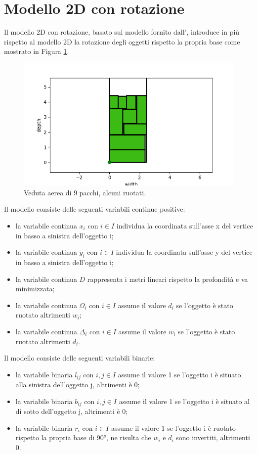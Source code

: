 \section{Modello 2D con rotazione}
Il modello 2D con rotazione, basato sul modello fornito dall', introduce in più rispetto al modello 2D la rotazione degli oggetti rispetto la propria base come mostrato in Figura \ref{fig:pacchi_ruotati}.
\begin{figure}[H]
	\begin{center} \includegraphics[scale=0.6]{figures/2dr}
		\caption[Pacchi ruotati]{Veduta aerea di 9 pacchi, alcuni ruotati.}
		\label{fig:pacchi_ruotati}
	\end{center}
\end{figure}

\noindent Il modello consiste delle seguenti variabili continue positive:
\begin{itemize}
	\item la variabile continua $x_{i}$ con $i \in I$ individua la coordinata sull'asse x del vertice in basso a sinistra dell'oggetto i;
	\item la variabile continua $y_{i}$ con $i \in I$ individua la coordinata sull'asse y del vertice in basso a sinistra dell'oggetto i;
	\item la variabile continua $D$ rappresenta i metri lineari rispetto la profondità e va minimizzata;
	\item la variabile continua $\Omega_{i}$ con $i \in I$ assume il valore $d_i$ se l'oggetto è stato ruotato altrimenti $w_i$;
	\item la variabile continua $\Delta_{i}$ con $i \in I$ assume il valore $w_i$ se l'oggetto è stato ruotato altrimenti $d_i$.
\end{itemize}
Il modello consiste delle seguenti variabili binarie:
\begin{itemize}
	\item la variabile binaria $l_{ij}$ con $i,j \in I$ assume il valore 1 se l'oggetto i è situato alla sinistra dell'oggetto j, altrimenti è 0;
	\item la variabile binaria $b_{ij}$ con $i,j \in I$ assume il valore 1 se l'oggetto i è situato al di sotto dell'oggetto j, altrimenti è 0;
	\item la variabile binaria $r_{i}$ con $i \in I$ assume il valore 1 se l'oggetto i è ruotato rispetto la propria base di 90°, ne risulta che $w_{i}$ e $d_{i}$ sono invertiti, altrimenti 0.
\end{itemize}

